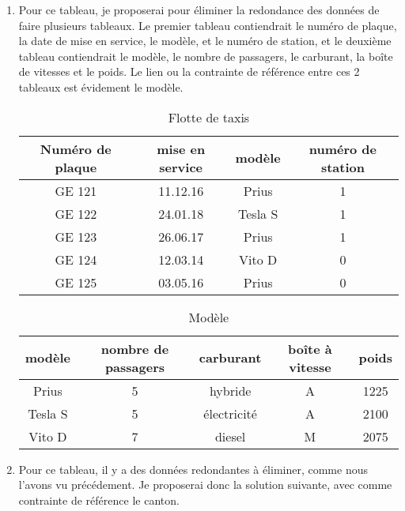 \documentclass{article}
\begin{document}
\begin{enumerate}
    \item Pour ce tableau, je proposerai pour éliminer la redondance des données de faire plusieurs tableaux. Le premier tableau contiendrait le numéro de plaque, la date de mise en service, le modèle, et le numéro de station, et le deuxième tableau contiendrait le modèle, le nombre de passagers, le carburant, la boîte de vitesses et le poids.
Le lien ou la contrainte de référence entre ces 2 tableaux est évidement le modèle.
\begin{table}[h!]
    \centering
    \begin{tabular}{|c|c|c|c|}
\hline
Numéro de plaque & mise en service & modèle & numéro de station \\
\hline
\hline
GE 121 & 11.12.16 & Prius & 1 \\
\hline
GE 122 & 24.01.18 & Tesla S & 1 \\
\hline
GE 123 & 26.06.17 & Prius & 1 \\
\hline
GE 124 & 12.03.14 & Vito D & 0 \\
\hline
GE 125 & 03.05.16 & Prius & 0 \\
\hline
\end{tabular}
    \caption{Flotte de taxis}
    \label{tab:my_label}
\end{table}

\begin{table}[h!]
    \centering
    \begin{tabular}{|c|c|c|c|c|}
\hline
modèle & nombre de passagers & carburant & boîte à vitesse & poids \\
\hline
\hline
Prius & 5 & hybride & A & 1225 \\
\hline
Tesla S & 5 & électricité & A & 2100 \\
\hline
Vito D & 7 & diesel & M & 2075 \\
\hline
\end{tabular}
    \caption{Modèle}
    \label{tab:my_label}
\end{table}

\newpage
    \item Pour ce tableau, il y a des données redondantes à éliminer, comme nous l'avons vu précédement. Je proposerai donc la solution suivante, avec comme contrainte de référence le canton. 


\end{enumerate}
\end{document}

